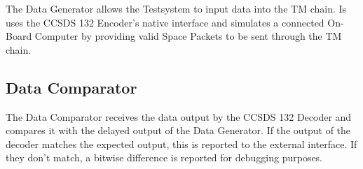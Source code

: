 The Data Generator allows the Testsystem to input data into the TM chain. Is uses the CCSDS 132 Encoder's native interface and simulates a connected On-Board Computer by providing valid Space Packets to be sent through the TM chain.

\subsection{Data Comparator}

The Data Comparator receives the data output by the CCSDS 132 Decoder and compares it with the delayed output of the Data Generator. If the output of the decoder matches the expected output, this is reported to the external interface. If they don't match, a bitwise difference is reported for debugging purposes.